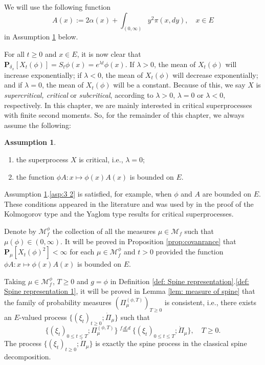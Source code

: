 \documentclass[UTF8]{pkuthss}
\theoremstyle{plain}
\theoremstyle{definition}
\newtheorem{asp}{Assumption}[chapter]
\numberwithin{equation}{section}
\begin{document}
We will use the following function
 \[
	A(x)
	:= 2\alpha(x) + \int_{(0,\infty)} y^2\pi(x,dy),
	\quad x\in E
  \]
in Assumption \ref{asp:3} below.


	For all $t \geq 0$ and $x\in E$, it is now clear that
$
  \mathbf P_{\delta_x}[X_t(\phi)]
  = S_t \phi(x)
  = e^{\lambda t} \phi(x).
$
  If $\lambda > 0$, the mean of $X_t(\phi)$ will increase exponentially; if $\lambda < 0$, the mean of $X_t(\phi)$ will decrease exponentially; and if $\lambda = 0$, the mean of $X_t(\phi)$ will be a constant.
  Because of this, we say $X$ is \emph{supercritical, critical} or \emph{subcritical}, according to $\lambda > 0$, $\lambda = 0$ or $\lambda < 0$, respectively.
	In this chapter, we are mainly interested in critical superprocesses with finite second moments.
So, for the remainder of this chapter, we always assume the following:
\begin{asp}\label{asp:3}
\begin{enumerate}
\item \label{asp:3 1} 
	the superprocess $X$ is critical, i.e., $\lambda = 0 $;
\item \label{asp:3 2} 
	the function $\phi A:x\mapsto \phi(x)A(x)$  is bounded on $E$.
\end{enumerate}
\end{asp}

	Assumption \ref{asp:3}.\eqref{asp:3 2} is satisfied, for example, when $\phi$ and $A$ are bounded on $E$.
	These conditions appeared in the literature and was used by \cite{RenSongZhang2015Limit} in the proof of the Kolmogorov type and the Yaglom type results for critical superprocesses.

 	Denote by $\mathcal M_f^\phi$ the collection of all the measures $\mu \in \mathcal M_f$ such that $\mu(\phi) \in (0,\infty)$.
  	It will be proved in Proposition \ref{prop:covanrance} that $\mathbf P_\mu[X_t(\phi)^2]< \infty$ for each $\mu \in \mathcal M^\phi_f$ and $t>0$ provided the function
$
	\phi A: x\mapsto \phi(x) A(x)
$
	is bounded on $E$.


	Taking $\mu \in \mathcal M_f^{\phi}$, $T\geq 0$ and $g = \phi$ in Definition \ref{def: Spine representation}.\eqref{def: Spine representation 1}, it will be proved in Lemma \ref{lem: measure of spine} that the family of probability measures $(\Pi_\mu^{(\phi,T)})_{T\geq 0}$ is consistent,
	i.e., there exists an $E$-valued process $\{(\xi_t)_{t\geq 0}; \dot{\Pi}_\mu\}$ such that
\[	\{(\xi_t)_{0\leq t\leq T}; \Pi_\mu^{(\phi,T)}\}
	\overset{f.d.d}{=}\{(\xi_t)_{0\leq t\leq T}; \dot{\Pi}_\mu\},
	\quad T\geq 0.
\]	
	The process $\{(\xi_t)_{t\geq 0}; \dot{\Pi}_\mu\}$ is exactly the spine process in the classical spine decomposition.
\end{document}
